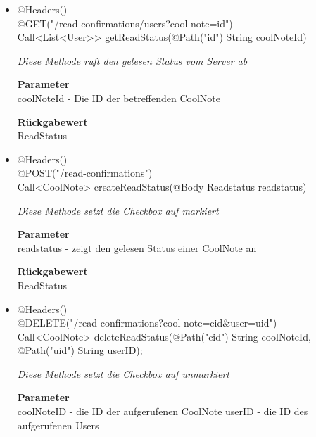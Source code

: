 \documentclass[a4paper]{scrreprt}
\begin{document}
            \begin{itemize}
        		\item{@Headers()\\@GET("/read-confirmations/users?cool-note={id}") \\ Call<List<User>> getReadStatus(@Path("id") String coolNoteId)}
        	
        		\textit{Diese Methode ruft den gelesen Status vom Server ab}
        	
        		\textbf{Parameter} \\
                 coolNoteId - Die ID der betreffenden CoolNote
        		        	
       		 	\textbf{Rückgabewert} \\
                ReadStatus
      		  	 
      	     	\item{@Headers()\\ @POST("/read-confirmations") \\ Call<CoolNote> createReadStatus(@Body Readstatus readstatus) } 
        	
        		\textit{Diese Methode setzt die Checkbox auf markiert}
        	
        		\textbf{Parameter} \\
                 readstatus - zeigt den gelesen Status einer CoolNote an
        		        	
       		 	\textbf{Rückgabewert} \\
                ReadStatus
        	
       		 
            	  	 
      	     	\item{@Headers()\\ @DELETE("/read-confirmations?cool-note={cid}\&user={uid}")}
 \\Call<CoolNote> deleteReadStatus(@Path("cid") String coolNoteId,
                                     @Path("uid") String userID);
        	
        		\textit{Diese Methode setzt die Checkbox auf unmarkiert}
        	
        		\textbf{Parameter} \\
                coolNoteID - die ID der aufgerufenen CoolNote
                userID - die ID des aufgerufenen Users
        		        	
              
        	
       		 \end{itemize}
            
\end{document}
